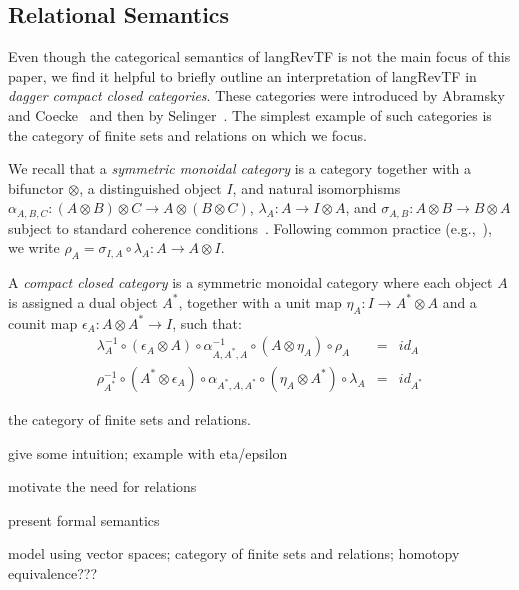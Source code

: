 \documentclass{llncs}
\begin{document}
\subsection{Relational Semantics}

Even though the categorical semantics of {{langRevTF}} is not the main focus
of this paper, we find it helpful to briefly outline an interpretation of
{{langRevTF}} in \emph{dagger compact closed categories}. These categories
were introduced by Abramsky and
Coecke~\cite{Abramsky:2004:CSQ:1018438.1021878} and then by
Selinger~\cite{Selinger:2007:DCC:1229185.1229207}. The simplest example of
such categories is the category of finite sets and relations on which we
focus.

We recall that a \emph{symmetric monoidal category} is a category together
with a bifunctor $\otimes$, a distinguished object $I$, and natural
isomorphisms $\alpha_{A,B,C} : (A \otimes B) \otimes C \rightarrow A \otimes
(B \otimes C)$, $\lambda_A : A \rightarrow I \otimes A$, and $\sigma_{A,B} :
A \otimes B \rightarrow B \otimes A$ subject to standard coherence
conditions~\cite{nla.cat-vn1051288}. Following common practice
(e.g.,~\cite{Selinger:2007:DCC:1229185.1229207}), we write $\rho_A =
\sigma_{I,A} \circ \lambda_A : A \rightarrow A \otimes I$.

A \emph{compact closed category} is a symmetric monoidal category where each
object $A$ is assigned a dual object $A^*$, together with a unit map $\eta_A
: I \rightarrow A^* \otimes A$ and a counit map $\epsilon_A : A \otimes A^*
\rightarrow I$, such that:
\[\begin{array}{rcl}
\lambda_A^{-1} \circ (\epsilon_A \otimes A) \circ \alpha_{A,A^*,A}^{-1} \circ (A \otimes \eta_A) \circ \rho_A &=& \mathit{id}_A \\
\rho_{A^*}^{-1} \circ (A^* \otimes \epsilon_A) \circ \alpha_{A^*,A,A^*} \circ (\eta_A \otimes A^*) \circ \lambda_A &=& \mathit{id}_{A^*}
\end{array}\]


the category of finite sets and relations.

give some intuition; example with eta/epsilon

motivate the need for relations

present formal semantics

model using vector spaces; category of finite sets and relations; homotopy
equivalence???
\end{document}
